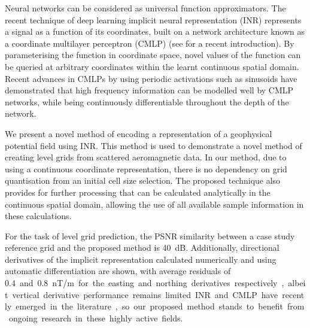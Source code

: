\documentclass[manuscript.tex]{subfiles}
\begin{document}
Neural networks can be considered as universal function approximators.
The recent technique of deep learning implicit neural representation (INR) \parencite{mildenhallNeRFRepresentingScenes2020} represents a signal as a function of its coordinates, built on a network architecture known as a coordinate multilayer perceptron (CMLP) (see \cite{ramasinghePeriodicityUnifyingFramework2022} for a recent introduction).
By parameterising the function in coordinate space, novel values of the function can be queried at arbitrary coordinates within the learnt continuous spatial domain.
Recent advances in CMLPs by using periodic activations such as sinusoids have demonstrated that high frequency information can be modelled well by CMLP networks, while being continuously differentiable throughout the depth of the network.

We present a novel method of encoding a representation of a geophysical potential field using INR\@.
This method is used to demonstrate a novel method of creating level grids from scattered aeromagnetic data.
In our method, due to using a continuous coordinate representation, there is no dependency on grid quantisation from an initial cell size selection.
The proposed technique also provides for further processing that can be calculated analytically in the continuous spatial domain, allowing the use of all available sample information in these calculations.

For the task of level grid prediction, the PSNR similarity between a case study reference grid and the proposed method is \SI{40}{\dB}.
Additionally, directional derivatives of the implicit representation calculated numerically and using automatic differentiation are shown, with average residuals of \SI{0.4} and \SI{0.8}{nT/m} for the easting and northing derivatives respectively, albeit vertical derivative performance remains limited.

INR and CMLP have recently emerged in the literature, so our proposed method stands to benefit from ongoing research in these highly active fields.
\end{document}

